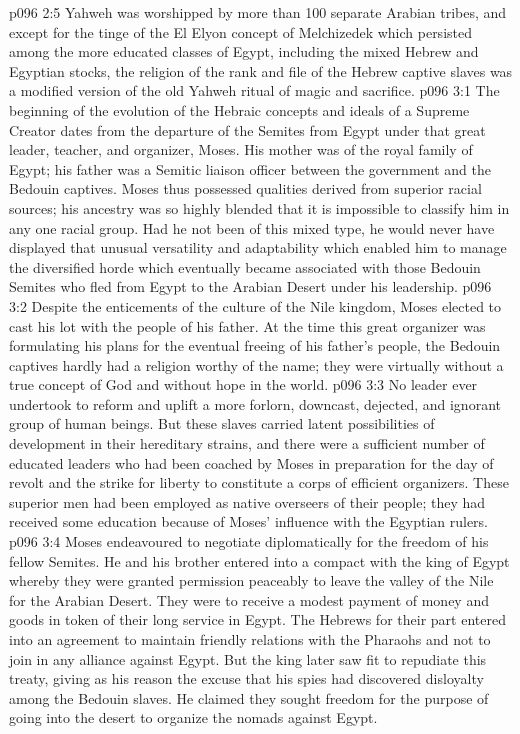 \vs p096 2:5 Yahweh was worshipped by more than 100 separate Arabian tribes, and except for the tinge of the El Elyon concept of Melchizedek which persisted among the more educated classes of Egypt, including the mixed Hebrew and Egyptian stocks, the religion of the rank and file of the Hebrew captive slaves was a modified version of the old Yahweh ritual of magic and sacrifice.
\vs p096 3:1 The beginning of the evolution of the Hebraic concepts and ideals of a Supreme Creator dates from the departure of the Semites from Egypt under that great leader, teacher, and organizer, Moses. His mother was of the royal family of Egypt; his father was a Semitic liaison officer between the government and the Bedouin captives. Moses thus possessed qualities derived from superior racial sources; his ancestry was so highly blended that it is impossible to classify him in any one racial group. Had he not been of this mixed type, he would never have displayed that unusual versatility and adaptability which enabled him to manage the diversified horde which eventually became associated with those Bedouin Semites who fled from Egypt to the Arabian Desert under his leadership.
\vs p096 3:2 Despite the enticements of the culture of the Nile kingdom, Moses elected to cast his lot with the people of his father. At the time this great organizer was formulating his plans for the eventual freeing of his father’s people, the Bedouin captives hardly had a religion worthy of the name; they were virtually without a true concept of God and without hope in the world.
\vs p096 3:3 \pc No leader ever undertook to reform and uplift a more forlorn, downcast, dejected, and ignorant group of human beings. But these slaves carried latent possibilities of development in their hereditary strains, and there were a sufficient number of educated leaders who had been coached by Moses in preparation for the day of revolt and the strike for liberty to constitute a corps of efficient organizers. These superior men had been employed as native overseers of their people; they had received some education because of Moses’ influence with the Egyptian rulers.
\vs p096 3:4 Moses endeavoured to negotiate diplomatically for the freedom of his fellow Semites. He and his brother entered into a compact with the king of Egypt whereby they were granted permission peaceably to leave the valley of the Nile for the Arabian Desert. They were to receive a modest payment of money and goods in token of their long service in Egypt. The Hebrews for their part entered into an agreement to maintain friendly relations with the Pharaohs and not to join in any alliance against Egypt. But the king later saw fit to repudiate this treaty, giving as his reason the excuse that his spies had discovered disloyalty among the Bedouin slaves. He claimed they sought freedom for the purpose of going into the desert to organize the nomads against Egypt.
